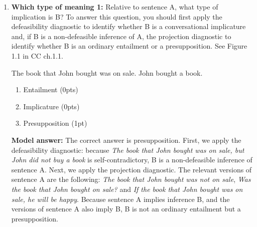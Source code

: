 \documentclass[a4,11pt]{article}
\begin{document}
\begin{enumerate}[leftmargin = 12pt]
{\bf Model answer:}  The correct answer is that the inference is a presupposition. If Colin judges that the inference arises not just from the original sentence but also from the variants where entailments ``normally go to die'' (as CC write on p.27), then the inference is not an ordinary entailment but a presupposition.

       
 \item {\bf Which type of meaning 1:} Relative to sentence A, what type of implication is B? To answer this question, you should first apply the defeasibility diagnostic to identify whether B is a conversational implicature and, if B is a non-defeasible inference of A, the projection diagnostic to identify whether B is an ordinary entailment or a presupposition. See Figure 1.1 in CC ch.1.1.
\begin{exe}
\exi{}
\begin{xlist}
 The book that John bought was on sale.
 John bought a book.
\end{xlist}
\end{exe}

 
   \begin{enumerate}[noitemsep]
        \item Entailment (0pts)
         \item Implicature (0pts)
           \item Presupposition (1pt)
    \end{enumerate}

{\bf Model answer:} The correct answer is presupposition. First, we apply the defeasibility diagnostic: because {\em The book that John bought was on sale, but John did not buy a book} is self-contradictory, B is a non-defeasible inference of sentence A. Next, we apply the projection diagnostic. The relevant versions of sentence A are the following: {\em The book that John bought was not on sale}, {\em Was the book that John bought on sale?} and {\em If the book that John bought was on sale, he will be happy}. Because sentence A implies inference B, and the versions of sentence A also imply B, B is not an ordinary entailment but a presupposition.
 

\end{enumerate}
\end{document}
